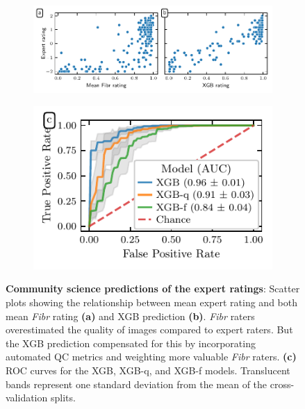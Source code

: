 \documentclass[9pt,lineno]{elife}
\begin{document}
\begin{figure}[tbp]
\begin{fullwidth}
    {\label{fig:fibr-qc:scatter:fibr}}
    {\label{fig:fibr-qc:scatter:xgb}}
    {\label{fig:fibr-qc:roc}}
    \begin{subfigure}{.63\linewidth}
    \centering
    \includegraphics[width=\linewidth]{community-qc/fibr-rating-scatter-plot.pdf}
    \end{subfigure}
    \begin{subfigure}{.37\linewidth}
    \centering
    \includegraphics[width=\linewidth]{community-qc/xgb-roc-curve.pdf}
    \end{subfigure}
    \caption{%
        {\bf Community science predictions of the expert ratings}:
        Scatter plots showing the relationship between mean expert rating and
        both mean \emph{Fibr} rating \textbf{(a)} and XGB prediction
        \textbf{(b)}. \emph{Fibr} raters overestimated the quality of images
        compared to expert raters. But the XGB prediction compensated for this
        by incorporating automated QC metrics and weighting more valuable
        \emph{Fibr} raters.
        \textbf{(c)} ROC curves for the XGB, XGB-q, and XGB-f models.
        Translucent bands represent one standard deviation from the mean
        of the cross-validation splits.
    }
    \label{fig:fibr-qc}
\end{fullwidth}
\end{figure}
\end{document}
